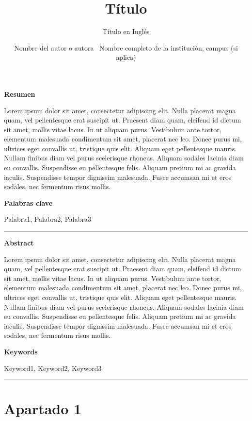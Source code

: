 \documentclass[
]{interact}
\title{Título}
\subtitle{Título en Inglés}
\author{Nombre del autor o autora \textbar\ Nombre completo de la
institución, campus (si aplica)}
\begin{document}
\captionsetup{labelsep=space}
\maketitle


\newcommand{\articuloTitulo}{Hegemonía algorítmica}

\textbf{Resumen}

Lorem ipsum dolor sit amet, consectetur adipiscing elit. Nulla placerat
magna quam, vel pellentesque erat suscipit ut. Praesent diam quam,
eleifend id dictum sit amet, mollis vitae lacus. In ut aliquam purus.
Vestibulum ante tortor, elementum malesuada condimentum sit amet,
placerat nec leo. Donec purus mi, ultrices eget convallis ut, tristique
quis elit. Aliquam eget pellentesque mauris. Nullam finibus diam vel
purus scelerisque rhoncus. Aliquam sodales lacinia diam eu convallis.
Suspendisse eu pellentesque felis. Aliquam pretium mi ac gravida
iaculis. Suspendisse tempor dignissim malesuada. Fusce accumsan mi et
eros sodales, nec fermentum risus mollis.

\textbf{Palabras clave}

Palabra1, Palabra2, Palabra3

\begin{center}\rule{0.5\linewidth}{0.5pt}\end{center}

\textbf{Abstract}

Lorem ipsum dolor sit amet, consectetur adipiscing elit. Nulla placerat
magna quam, vel pellentesque erat suscipit ut. Praesent diam quam,
eleifend id dictum sit amet, mollis vitae lacus. In ut aliquam purus.
Vestibulum ante tortor, elementum malesuada condimentum sit amet,
placerat nec leo. Donec purus mi, ultrices eget convallis ut, tristique
quis elit. Aliquam eget pellentesque mauris. Nullam finibus diam vel
purus scelerisque rhoncus. Aliquam sodales lacinia diam eu convallis.
Suspendisse eu pellentesque felis. Aliquam pretium mi ac gravida
iaculis. Suspendisse tempor dignissim malesuada. Fusce accumsan mi et
eros sodales, nec fermentum risus mollis.

\textbf{Keywords}

Keyword1, Keyword2, Keyword3

\begin{center}\rule{0.5\linewidth}{0.5pt}\end{center}

\section{Apartado 1}\label{apartado-1}
\end{document}
